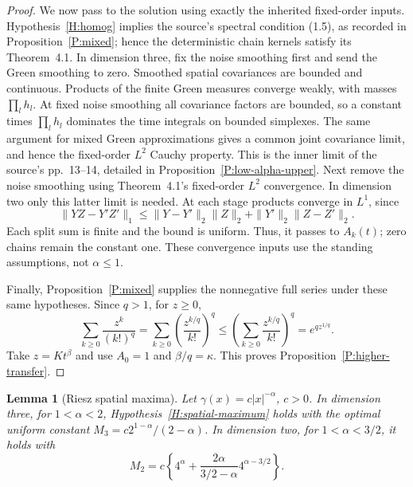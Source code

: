 \documentclass[12pt]{article}
\numberwithin{equation}{section}
\newtheorem{lemma}[theorem]{Lemma}
\theoremstyle{definition}
\begin{document}
\begin{proof}
  We now pass to the solution using exactly the inherited fixed-order
  inputs. Hypothesis~\ref{H:homog} implies the source's spectral
  condition (1.5), as recorded in Proposition~\ref{P:mixed}; hence the
  deterministic chain kernels satisfy its Theorem~4.1. In dimension
  three, fix the noise smoothing first and send the Green smoothing
  to zero. Smoothed spatial covariances are bounded and continuous.
  Products of the finite Green measures converge weakly, with masses
  $\prod_lh_l$. At fixed noise smoothing all covariance factors are
  bounded, so a constant times $\prod_lh_l$ dominates the time
  integrals on bounded simplexes. The same argument for mixed Green
  approximations gives a common joint covariance limit, and hence the
  fixed-order $L^2$ Cauchy property. This is the inner limit of the
  source's pp.~13--14, detailed in Proposition~\ref{P:low-alpha-upper}.
  Next remove the noise smoothing using Theorem~4.1's fixed-order
  $L^2$ convergence. In dimension two only this latter limit is needed.
  At each stage products converge in $L^1$, since
  \[
    \|YZ-Y'Z'\|_1
    \le\|Y-Y'\|_2\|Z\|_2+\|Y'\|_2\|Z-Z'\|_2.
  \]
  Each split sum is finite and the bound is uniform. Thus, it passes
  to $A_k(t)$; zero chains remain the constant one. These convergence
  inputs use the standing assumptions, not $\alpha\le1$.

  Finally, Proposition~\ref{P:mixed} supplies the nonnegative full
  series under these same hypotheses. Since $q>1$, for $z\ge0$,
  \[
    \sum_{k\ge0}\frac{z^k}{(k!)^q}
    =\sum_{k\ge0}\left(\frac{z^{k/q}}{k!}\right)^q
    \le\left(\sum_{k\ge0}\frac{z^{k/q}}{k!}\right)^q
    =e^{qz^{1/q}}.
  \]
  Take $z=Kt^\beta$ and use $A_0=1$ and $\beta/q=\kappa$.
  This proves Proposition~\ref{P:higher-transfer}.
\end{proof}

\begin{lemma}[Riesz spatial maxima]\label{L:higher-riesz}
  Let $\gamma(x)=c|x|^{-\alpha}$, $c>0$. In dimension three, for
  $1<\alpha<2$, Hypothesis~\ref{H:spatial-maximum} holds with the
  optimal uniform constant $M_3=c2^{1-\alpha}/(2-\alpha)$.
  In dimension two, for $1<\alpha<3/2$, it holds with
  \[
    M_2=c\left\{4^\alpha+
    \frac{2\alpha}{3/2-\alpha}4^{\alpha-3/2}\right\}.
  \]
\end{lemma}
\end{document}
